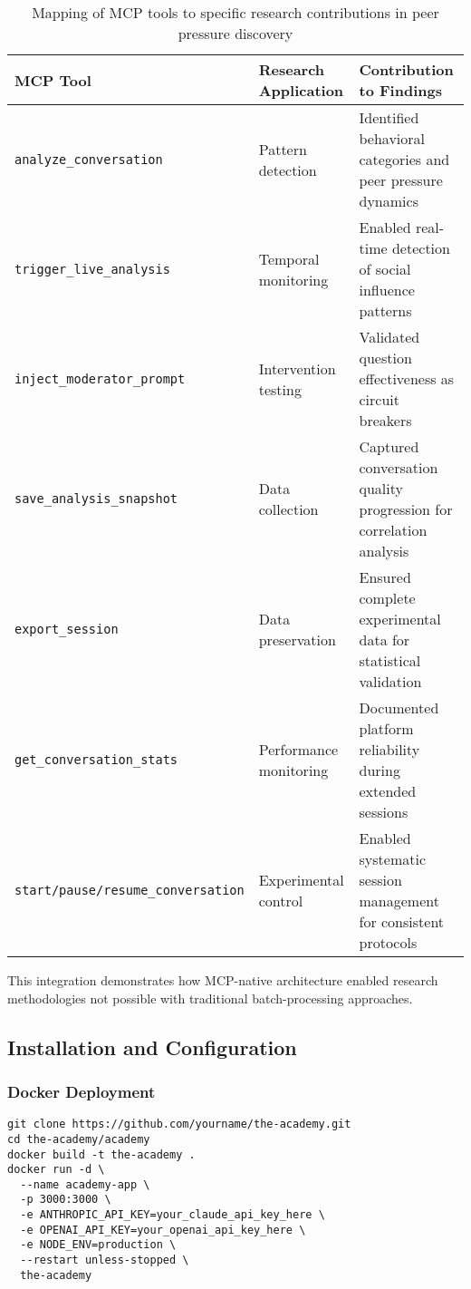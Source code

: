 \documentclass[11pt,letterpaper]{article}
\begin{document}
\begin{table}[h]
\centering
\begin{tabular}{p{4cm}p{4cm}p{6cm}}
\toprule
\textbf{MCP Tool} & \textbf{Research Application} & \textbf{Contribution to Findings} \\
\midrule
\texttt{analyze\_conversation} & Pattern detection & Identified behavioral categories and peer pressure dynamics \\
\texttt{trigger\_live\_analysis} & Temporal monitoring & Enabled real-time detection of social influence patterns \\
\texttt{inject\_moderator\_prompt} & Intervention testing & Validated question effectiveness as circuit breakers \\
\texttt{save\_analysis\_snapshot} & Data collection & Captured conversation quality progression for correlation analysis \\
\texttt{export\_session} & Data preservation & Ensured complete experimental data for statistical validation \\
\texttt{get\_conversation\_stats} & Performance monitoring & Documented platform reliability during extended sessions \\
\texttt{start/pause/resume\_conversation} & Experimental control & Enabled systematic session management for consistent protocols \\
\bottomrule
\end{tabular}
\caption{Mapping of MCP tools to specific research contributions in peer pressure discovery}
\label{tab:mcp_contributions}
\end{table}

This integration demonstrates how MCP-native architecture enabled research methodologies not possible with traditional batch-processing approaches.

\subsection{Installation and Configuration}

\subsubsection{Docker Deployment}
\begin{verbatim}
git clone https://github.com/yourname/the-academy.git
cd the-academy/academy
docker build -t the-academy .
docker run -d \
  --name academy-app \
  -p 3000:3000 \
  -e ANTHROPIC_API_KEY=your_claude_api_key_here \
  -e OPENAI_API_KEY=your_openai_api_key_here \
  -e NODE_ENV=production \
  --restart unless-stopped \
  the-academy
\end{verbatim}
\end{document}
